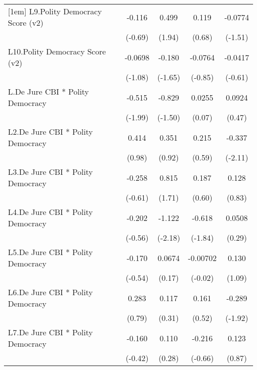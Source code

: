{\begin{tabular}{l*{4}{c}}
[1em]
L9.Polity Democracy Score (v2)&   -0.116         &    0.499         &    0.119         &  -0.0774         \\
                &  (-0.69)         &   (1.94)         &   (0.68)         &  (-1.51)         \\
[1em]
L10.Polity Democracy Score (v2)&  -0.0698         &   -0.180         &  -0.0764         &  -0.0417         \\
                &  (-1.08)         &  (-1.65)         &  (-0.85)         &  (-0.61)         \\
[1em]
L.De Jure CBI * Polity Democracy&   -0.515\sym{*}  &   -0.829         &   0.0255         &   0.0924         \\
                &  (-1.99)         &  (-1.50)         &   (0.07)         &   (0.47)         \\
[1em]
L2.De Jure CBI * Polity Democracy&    0.414         &    0.351         &    0.215         &   -0.337\sym{*}  \\
                &   (0.98)         &   (0.92)         &   (0.59)         &  (-2.11)         \\
[1em]
L3.De Jure CBI * Polity Democracy&   -0.258         &    0.815         &    0.187         &    0.128         \\
                &  (-0.61)         &   (1.71)         &   (0.60)         &   (0.83)         \\
[1em]
L4.De Jure CBI * Polity Democracy&   -0.202         &   -1.122\sym{*}  &   -0.618         &   0.0508         \\
                &  (-0.56)         &  (-2.18)         &  (-1.84)         &   (0.29)         \\
[1em]
L5.De Jure CBI * Polity Democracy&   -0.170         &   0.0674         & -0.00702         &    0.130         \\
                &  (-0.54)         &   (0.17)         &  (-0.02)         &   (1.09)         \\
[1em]
L6.De Jure CBI * Polity Democracy&    0.283         &    0.117         &    0.161         &   -0.289         \\
                &   (0.79)         &   (0.31)         &   (0.52)         &  (-1.92)         \\
[1em]
L7.De Jure CBI * Polity Democracy&   -0.160         &    0.110         &   -0.216         &    0.123         \\
                &  (-0.42)         &   (0.28)         &  (-0.66)         &   (0.87)         \\

\end{tabular}}
